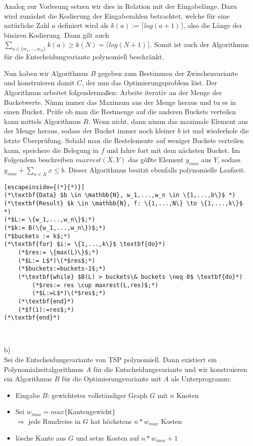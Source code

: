 \documentclass{article}
\begin{document}
Analog zur Vorlesung setzen wir dies in Relation mit der Eingabelänge. Dazu wird zunächst die Kodierung der Eingabezahlen betrachtet, welche für eine natürliche Zahl $a$ definiert wird als $k(a):= \lceil log(a+1)\rceil$, also die Länge der binären Kodierung. Dann gilt auch $\sum_{a \in \{w_1,...,w_N \}} k(a) \geq  k(N) =  \lceil log(N+1)\rceil$. Somit ist auch der Algorithmus für die Entscheidungvariante polynomiell beschränkt.

Nun haben wir Algorithmus $B$ gegeben zum Bestimmen der Zwischenvariante und konstruieren damit $C$, der nun das Optimierungsproblem löst. Der Algorithmus arbeitet folgendermaßen: Arbeite iterativ an der Menge der Bucketwerte. Nimm immer das Maximum aus der Menge heraus und tu es in einen Bucket. Prüfe ob man die Restmenge auf die anderen Buckets verteilen kann mittels Algorithmus $B$. Wenn nicht, dann nimm das maximale Element aus der Menge heraus, sodass der Bucket immer noch kleiner $b$ ist und wiederhole die letzte Überprüfung. Sobald man die Restelemente auf weniger Buckets verteilen kann, speichere die Belegung in $f$ und fahre fort mit dem nächsten Bucket. Im Folgendem beschreiben $maxrest(X,Y)$ das gößte Element $y_{max}$ aus $Y$, sodass $y_{max}+ \sum_{x \in X}x \leq b$. Dieser Algorithmus besitzt ebenfalls polynomielle Laufzeit.  \\

\begin{lstlisting}[escapeinside={(*}{*)}]
(*\textbf{Data} $b \in \mathbb{N}, w_1,...,w_n \in \{1,...,b\}$ *)
(*\textbf{Result} $k \in \mathbb{N}, f: \{1,...,N\} \to \{1,...,k\}$ *)
(*$L:= \{w_1,...,w_n\}$;*)
(*$k:= B(\{w_1,...,w_n\})$;*)
(*$buckets := k$;*)
(*\textbf{for} $i:= \{1,...,k\}$ \textbf{do}*) 
	(*$res:= \{max(L)\}$;*)
	(*$L:= L$*)\(*$res$;*)
	(*$buckets:=buckets-1$;*)  
	(*\textbf{while} $B(L) > buckets\& buckets \neq 0$ \textbf{do}*) 
		(*$res:= res \cup maxrest(L,res)$;*)
		(*$L:=L$*)\(*$res$;*)
	(*\textbf{end}*)
	(*$f(i):=res$;*)
(*\textbf{end}*)		
\end{lstlisting}

~\

b)\\
Sei die Entscheidungsvariante von TSP polynomiell. Dann existiert ein Polynomialzeitalgorithmus $A$ für die Entscheidungsvariante und wir konstruieren ein Algorithmus $B$ für die Optimierungsvariante mit $A$ als Unterprogramm:\\
\begin{itemize}
\item Eingabe $B$: gewichtetes vollständiger Graph $G$ mit $n$ Knoten
\item Sei $w_{max}= max\{$Kantengewicht$\}$\\
$\Rightarrow$ jede Rundreise in $G$ hat höchstens $n*w_{max}$ Kosten
\item lösche Kante aus $G$ und setze Kosten auf $n*w_{max}+1$
\end{itemize}
\end{document}
